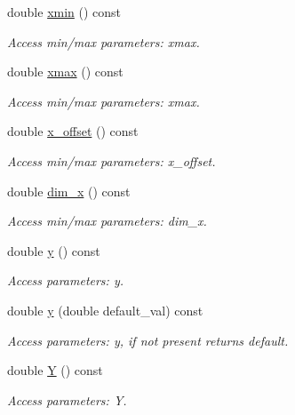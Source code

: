 \begin{DoxyCompactItemize}
double \hyperlink{struct_d_d4hep_1_1_x_m_l_1_1_child_value_a39702751aae67ff2b9bce0aab83cd1a3}{xmin} () const
\begin{DoxyCompactList}\small\item\em Access min/max parameters\+: xmax. \end{DoxyCompactList}\item 
double \hyperlink{struct_d_d4hep_1_1_x_m_l_1_1_child_value_aece8cde74d53459f2ea675713e7ae1c8}{xmax} () const
\begin{DoxyCompactList}\small\item\em Access min/max parameters\+: xmax. \end{DoxyCompactList}\item 
double \hyperlink{struct_d_d4hep_1_1_x_m_l_1_1_child_value_a3b0bd6317964cd3c6d70d217c625dcbd}{x\+\_\+offset} () const
\begin{DoxyCompactList}\small\item\em Access min/max parameters\+: x\+\_\+offset. \end{DoxyCompactList}\item 
double \hyperlink{struct_d_d4hep_1_1_x_m_l_1_1_child_value_a44f7119766182bb9057e76d97e712078}{dim\+\_\+x} () const
\begin{DoxyCompactList}\small\item\em Access min/max parameters\+: dim\+\_\+x. \end{DoxyCompactList}\item 
double \hyperlink{struct_d_d4hep_1_1_x_m_l_1_1_child_value_a5acc075a40e7740d6f8b3904eba9ab32}{y} () const
\begin{DoxyCompactList}\small\item\em Access parameters\+: y. \end{DoxyCompactList}\item 
double \hyperlink{struct_d_d4hep_1_1_x_m_l_1_1_child_value_afcb80ed7c8054635bc80cb0c64695504}{y} (double default\+\_\+val) const
\begin{DoxyCompactList}\small\item\em Access parameters\+: y, if not present returns default. \end{DoxyCompactList}\item 
double \hyperlink{struct_d_d4hep_1_1_x_m_l_1_1_child_value_a9631b12c7e3c614df092a9f0d5b06aa3}{Y} () const
\begin{DoxyCompactList}\small\item\em Access parameters\+: Y. \end{DoxyCompactList}\item 

\end{DoxyCompactItemize}
